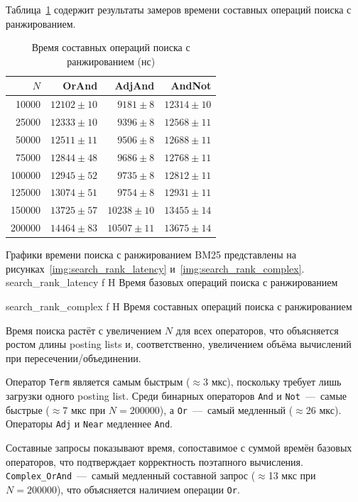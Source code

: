 \documentclass{itmo}
\begin{document}
Таблица~\ref{tab:searchrank-complex} содержит результаты замеров времени составных операций поиска с ранжированием.
\begin{table}[H]
	\centering
	\caption{Время составных операций поиска с ранжированием (нс)}
	\label{tab:searchrank-complex}
	\begin{tabular}{|r|r|r|r|}
		\toprule
		$N$ & OrAnd & AdjAnd & AndNot \\
		\midrule
		10000  & $12102 \pm 10$ & $9181 \pm 8$   & $12314 \pm 10$ \\
		25000  & $12333 \pm 10$ & $9396 \pm 8$   & $12568 \pm 11$ \\
		50000  & $12511 \pm 11$ & $9506 \pm 8$   & $12688 \pm 11$ \\
		75000  & $12844 \pm 48$ & $9686 \pm 8$   & $12768 \pm 11$ \\
		100000 & $12945 \pm 52$ & $9735 \pm 8$   & $12812 \pm 11$ \\
		125000 & $13074 \pm 51$ & $9754 \pm 8$   & $12931 \pm 11$ \\
		150000 & $13725 \pm 57$ & $10238 \pm 10$ & $13455 \pm 14$ \\
		200000 & $14464 \pm 83$ & $10507 \pm 11$ & $13675 \pm 14$ \\
		\bottomrule
	\end{tabular}
\end{table}

Графики времени поиска с ранжированием BM25 представлены на рисунках~\ref{img:search_rank_latency} и~\ref{img:search_rank_complex}.
	{search_rank_latency}
	{f}
	{H}
	{\textwidth}
	{Время базовых операций поиска с ранжированием}

	{search_rank_complex}
	{f}
	{H}
	{\textwidth}
	{Время составных операций поиска с ранжированием}

Время поиска растёт с увеличением $N$ для всех операторов, что объясняется ростом длины posting lists и, соответственно, увеличением объёма вычислений при пересечении/объединении.

Оператор \texttt{Term} является самым быстрым ($\approx$3 мкс), поскольку требует лишь загрузки одного posting list.
Среди бинарных операторов \texttt{And} и \texttt{Not}~---~самые быстрые ($\approx$7 мкс при $N = 200000$), а \texttt{Or}~---~самый медленный ($\approx$26 мкс).
Операторы \texttt{Adj} и \texttt{Near} медленнее \texttt{And}.

Составные запросы показывают время, сопоставимое с суммой времён базовых операторов, что подтверждает корректность поэтапного вычисления.
\texttt{Complex\_OrAnd}~---~самый медленный составной запрос ($\approx$13 мкс при $N = 200000$), что объясняется наличием операции \texttt{Or}.
\end{document}
